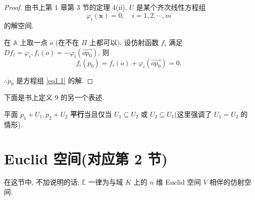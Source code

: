 \documentclass{ctexart}
\begin{document}
\begin{proof}
    由书上第 1 章第 3 节的定理 4(ii), $U$ 是某个齐次线性方程组
    \[\varphi_i(\boldsymbol{x})=0,\quad i=1,2,\cdots,m\]
    的解空间.

    在 $\mathbb{A}$ 上取一点 $\dot{o}$ (在不在 $\varPi$ 上都可以). 设仿射函数 $f_i$ 满足 $Df_i=\varphi_i,f_i(\dot{o})=-\varphi_i(\overrightarrow{op_0})$, 则
    \[f_i(\dot{p}_0)=f_i(\dot{o})+\varphi_i(\overrightarrow{op_0})=0.\]

    $\therefore\dot{p}_0$ 是方程组 \ref{eq1.1} 的解.
\end{proof}
下面是书上定义 9 的另一个表述.
\begin{definition}
    平面 $\dot{p}_1+U_1,\dot{p}_2+U_2$ \textbf{平行}当且仅当 $U_1\subseteq U_2$ 或 $U_2\subseteq U_1$(这里强调了 $U_1=U_2$ 的情形).
\end{definition}
\section{Euclid 空间(对应第 2 节)}
在这节中, 不加说明的话, $\mathbb{E}$ 一律为与域 $K$ 上的 $n$ 维 Euclid 空间 $V$ 相伴的仿射空间.
\end{document}
